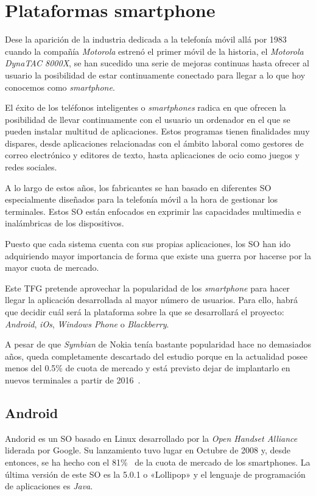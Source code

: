 \section{Plataformas smartphone}
\label{sec:plataformas}

Dese la aparición de la industria dedicada a la telefonía móvil allá por 1983 cuando la compañía
\emph{Motorola} estrenó el primer móvil de la historia, el \emph{Motorola DynaTAC 8000X}, se han
sucedido una serie de mejoras continuas hasta ofrecer al usuario la posibilidad de estar
continuamente conectado para llegar a lo que hoy conocemos como \emph{smartphone}.

El éxito de los teléfonos inteligentes o \emph{smartphones} radica en que ofrecen la posibilidad de
llevar continuamente con el usuario un ordenador en el que se pueden instalar multitud de
aplicaciones. Estos programas tienen finalidades muy dispares, desde aplicaciones relacionadas con
el ámbito laboral como gestores de correo electrónico y editores de texto, hasta aplicaciones de
ocio como juegos y redes sociales.

A lo largo de estos años, los fabricantes se han basado en diferentes \acf{SO} especialmente
diseñados para la telefonía móvil a la hora de gestionar los terminales. Estos \acs{SO} están
enfocados en exprimir las capacidades multimedia e inalámbricas de los dispositivos.

Puesto que cada sistema cuenta con sus propias aplicaciones, los \acs{SO} han ido adquiriendo mayor
importancia de forma que existe una guerra por hacerse por la mayor cuota de mercado.

Este \acs{TFG} pretende aprovechar la popularidad de los \emph{smartphone} para hacer llegar la
aplicación desarrollada al mayor número de usuarios. Para ello, habrá que decidir cuál será la
plataforma sobre la que se desarrollará el proyecto: \emph{Android}, \emph{iOs}, \emph{Windows
  Phone} o \emph{Blackberry}.

A pesar de que \emph{Symbian} de Nokia tenía bastante popularidad hace no demasiados años, queda
completamente descartado del estudio porque en la actualidad posee menos del 0.5\% de cuota de
mercado y está previsto dejar de implantarlo en nuevos terminales a partir de
2016~\cite{Litchfield13}.

\subsection{Android}

Andorid es un \acs{SO} basado en Linux desarrollado por la \emph{Open Handset Alliance} liderada por
Google. Su lanzamiento tuvo lugar en Octubre de 2008 y, desde entonces, se ha hecho con el
81\%~\cite{Llamas13} de la cuota de mercado de los smartphones. La última versión de este \acs{SO}
es la 5.0.1 o «Lollipop» y el lenguaje de programación de aplicaciones es \emph{Java}.

